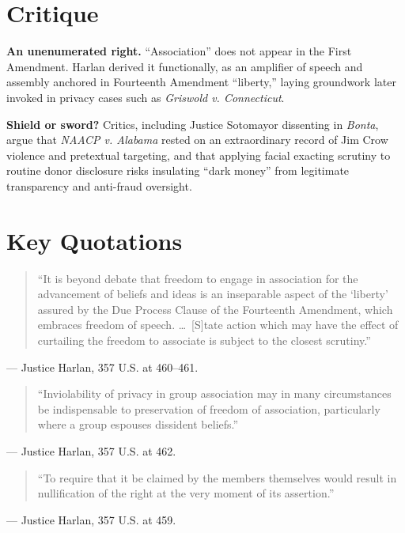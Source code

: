 \documentclass[12pt]{article}
\begin{document}
\section{Critique}

\textbf{An unenumerated right.} ``Association'' does not appear in the First Amendment. Harlan derived it functionally, as an amplifier of speech and assembly anchored in Fourteenth Amendment ``liberty,'' laying groundwork later invoked in privacy cases such as \textit{Griswold v. Connecticut}.

\textbf{Shield or sword?} Critics, including Justice Sotomayor dissenting in \textit{Bonta}, argue that \textit{NAACP v. Alabama} rested on an extraordinary record of Jim Crow violence and pretextual targeting, and that applying facial exacting scrutiny to routine donor disclosure risks insulating ``dark money'' from legitimate transparency and anti-fraud oversight.

\section{Key Quotations}

\begin{quote}
``It is beyond debate that freedom to engage in association for the advancement of beliefs and ideas is an inseparable aspect of the `liberty' assured by the Due Process Clause of the Fourteenth Amendment, which embraces freedom of speech. \dots\ [S]tate action which may have the effect of curtailing the freedom to associate is subject to the closest scrutiny.''
\end{quote}
\noindent --- Justice Harlan, 357 U.S. at 460--461.

\begin{quote}
``Inviolability of privacy in group association may in many circumstances be indispensable to preservation of freedom of association, particularly where a group espouses dissident beliefs.''
\end{quote}
\noindent --- Justice Harlan, 357 U.S. at 462.

\begin{quote}
``To require that it be claimed by the members themselves would result in nullification of the right at the very moment of its assertion.''
\end{quote}
\noindent --- Justice Harlan, 357 U.S. at 459.
\end{document}
